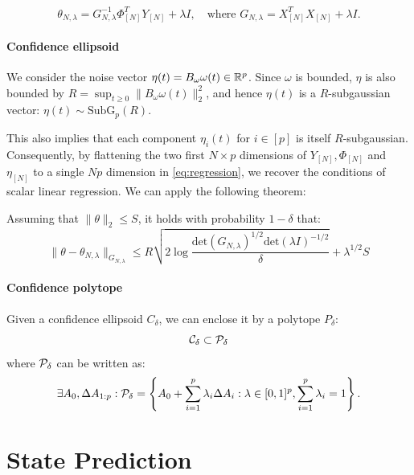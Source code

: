 \documentclass{article}
\begin{document}
\begin{equation*}
    \theta_{N,\lambda} = G_{N, \lambda}^{-1} \Phi^T_{[N]}Y_{[N]} + \lambda I, \quad \text{where } G_{N, \lambda} = X^T_{[N]}X_{[N]} + \lambda I.
\end{equation*}

\paragraph{Confidence ellipsoid}

We consider the noise vector $\eta(t) = B_\omega \omega(t)\in\mathbb{R}^p$. Since $\omega$ is bounded, $\eta$ is also bounded by $R=\sup_{t\geq 0}\|B_\omega \omega(t)\|_2^2$, and hence $\eta(t)$ is a $R$-subgaussian vector: $\eta(t)\sim \text{SubG}_p(R)$.

This also implies that each component $\eta_i(t)$ for $i\in[p]$ is itself $R$-subgaussian. Consequently, by flattening the two first $N\times p$ dimensions of $Y_{[N]}, \Phi_{[N]}$ and $\eta_{[N]}$ to a single $Np$ dimension in \eqref{eq:regression}, we recover the conditions of scalar linear regression. We can apply the following theorem:

\begin{theorem} Assuming that $\|\theta\|_2\leq S$, it holds with probability $1-\delta$ that:
\begin{equation*}
    \|\theta - \theta_{N,\lambda}\|_{G_{N,\lambda}} \leq R\sqrt{2\log \frac{\text{det}(G_{N,\lambda})^{1/2}\text{det}(\lambda I)^{-1/2}}{\delta}} + \lambda^{1/2}S
\end{equation*}
\end{theorem}


\paragraph{Confidence polytope}

Given a confidence ellipsoid $C_\delta$, we can enclose it by a polytope $P_\delta$:
\[\mathcal{C}_\delta \subset \mathcal{P}_\delta\]
where $\mathcal{P}_\delta$ can be written as:
\begin{equation}
     \exists A_0,\Delta A_{1:p}: \mathcal{P}_\delta = \left\{ A_{0}+\sum_{i=1}^{p}\lambda_{i}\Delta A_{i}: \lambda\in[0, 1]^p,  \sum_{i=1}^{p}\lambda_{i}=1\right\}.
\end{equation}


\section{State Prediction}
\end{document}
